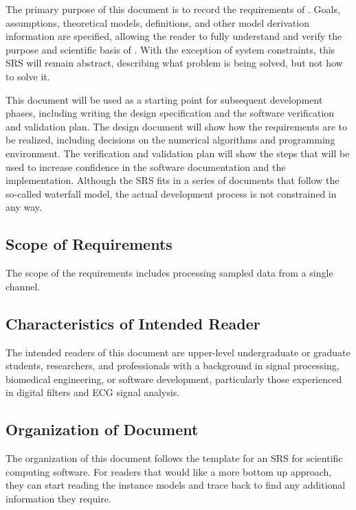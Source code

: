 \documentclass[12pt]{article}
\begin{document}
The primary purpose of this document is to record the requirements of \progname.
Goals, assumptions, theoretical models, definitions, and other model derivation
information are specified, allowing the reader to fully understand and verify
the purpose and scientific basis of \progname.  With the exception of system
constraints, this SRS will remain abstract, describing what problem is being
solved, but not how to solve it.

This document will be used as a starting point for subsequent development
phases, including writing the design specification and the software verification
and validation plan.  The design document will show how the requirements are to
be realized, including decisions on the numerical algorithms and programming
environment.  The verification and validation plan will show the steps that will
be used to increase confidence in the software documentation and the
implementation.  Although the SRS fits in a series of documents that follow the
so-called waterfall model, the actual development process is not constrained in
any way.

\subsection{Scope of Requirements} 

The scope of the requirements includes processing sampled data from a single
channel.

\subsection{Characteristics of Intended Reader} \label{sec_IntendedReader}

The intended readers of this document are upper-level undergraduate or graduate
students, researchers, and professionals with a background in signal processing,
biomedical engineering, or software development, particularly those experienced
in digital filters and ECG signal analysis.

\subsection{Organization of Document}

The organization of this document follows the template for an SRS for scientific
computing software. For readers that would like a more bottom up approach, they
can start reading the instance models and trace back to find any additional
information they require.
\end{document}
